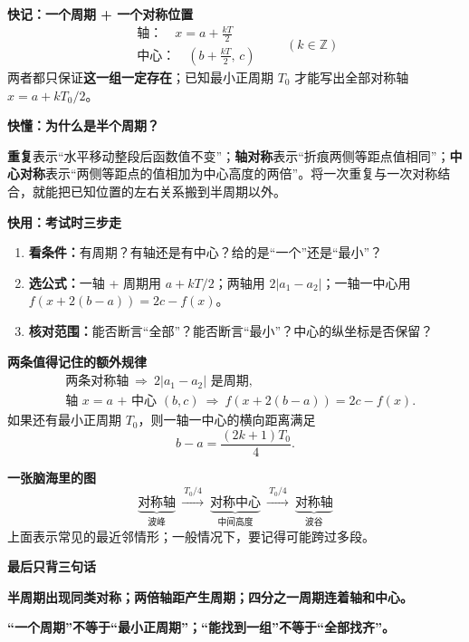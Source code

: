 \clearpage
\begin{summarybox}
\textbf{\textcolor{CSummary}{快记：一个周期 + 一个对称位置}}
\[
\boxed{\begin{gathered}
\text{轴：}\quad x=a+\frac{kT}{2}\\[2pt]
\text{中心：}\quad\left(b+\frac{kT}{2},\,c\right)
\end{gathered}\qquad(k\in\mathbb Z)}
\]
两者都只保证\textbf{这一组一定存在}；已知最小正周期 $T_0$ 才能写出全部对称轴 $x=a+kT_0/2$。

\medskip
\textbf{\textcolor{CSummary}{快懂：为什么是半个周期？}}

\textbf{重复}表示“水平移动整段后函数值不变”；\textbf{轴对称}表示“折痕两侧等距点值相同”；\textbf{中心对称}表示“两侧等距点的值相加为中心高度的两倍”。将一次重复与一次对称结合，就能把已知位置的左右关系搬到半周期以外。

\medskip
\textbf{\textcolor{CSummary}{快用：考试时三步走}}
\begin{enumerate}[leftmargin=*,itemsep=0.3em]
\item \textbf{看条件：}有周期？有轴还是有中心？给的是“一个”还是“最小”？
\item \textbf{选公式：}一轴 + 周期用 $a+kT/2$；两轴用 $2|a_1-a_2|$；一轴一中心用 $f(x+2(b-a))=2c-f(x)$。
\item \textbf{核对范围：}能否断言“全部”？能否断言“最小”？中心的纵坐标是否保留？
\end{enumerate}

\medskip
\textbf{\textcolor{CSummary}{两条值得记住的额外规律}}
\[
\boxed{\begin{aligned}
&\text{两条对称轴}\ \Longrightarrow\ 2|a_1-a_2|\text{ 是周期},\\
&\text{轴 $x=a$ + 中心 $(b,c)$}\ \Longrightarrow\
 f(x+2(b-a))=2c-f(x).
\end{aligned}}
\]
如果还有最小正周期 $T_0$，则一轴一中心的横向距离满足
\[
\boxed{b-a=\frac{(2k+1)T_0}{4}.}
\]

\medskip
\textbf{\textcolor{CSummary}{一张脑海里的图}}
\[
\underbrace{\text{对称轴}}_{\text{波峰}}
\ \xrightarrow{\ T_0/4\ }\
\underbrace{\text{对称中心}}_{\text{中间高度}}
\ \xrightarrow{\ T_0/4\ }\
\underbrace{\text{对称轴}}_{\text{波谷}}
\]
上面表示常见的最近邻情形；一般情况下，要记得可能跨过多段。

\medskip
\textbf{\textcolor{CSummary}{最后只背三句话}}
\begin{center}
\textbf{半周期出现同类对称；两倍轴距产生周期；四分之一周期连着轴和中心。}

\smallskip
\textbf{“一个周期”不等于“最小正周期”；“能找到一组”不等于“全部找齐”。}
\end{center}
\end{summarybox}
